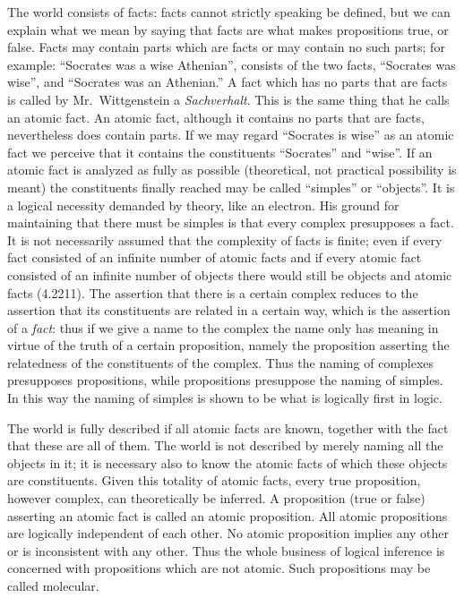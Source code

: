 The world consists of facts: facts cannot strictly speaking be defined, but we can explain what we mean by saying that facts are what makes propositions true, or false. Facts may contain parts which are facts or may contain no such parts; for example: “Socrates was a wise Athenian”, consists of the two facts, “Socrates was wise”, and “Socrates was an Athenian.” A fact which has no parts that are facts is called by Mr.\ Wittgenstein a \emph{Sachverhalt}. This is the same thing that he calls an atomic fact. An atomic fact, although it contains no parts that are facts, nevertheless does contain parts. If we may regard “Socrates is wise” as an atomic fact we perceive that it contains the constituents “Socrates” and “wise”. If an atomic fact is analyzed as fully as possible (theoretical, not practical possibility is meant) the constituents finally reached may be called “simples” or “objects”. It is a logical necessity demanded by theory, like an electron. His ground for maintaining that there must be simples is that every complex presupposes a fact. It is not necessarily assumed that the complexity of facts is finite; even if every fact consisted of an infinite number of atomic facts and if every atomic fact consisted of an infinite number of objects there would still be objects and atomic facts (4.2211). The assertion that there is a certain complex reduces to the assertion that its constituents are related in a certain way, which is the assertion of a \emph{fact}: thus if we give a name to the complex the name only has meaning in virtue of the truth of a certain proposition, namely the proposition asserting the relatedness of the constituents of the complex. Thus the naming of complexes presupposes propositions, while propositions presuppose the naming of simples. In this way the naming of simples is shown to be what is logically first in logic.

The world is fully described if all atomic facts are known, together with the fact that these are all of them. The world is not described by merely naming all the objects in it; it is necessary also to know the atomic facts of which these objects are constituents. Given this totality of atomic facts, every true proposition, however complex, can theoretically be inferred. A proposition (true or false) asserting an atomic fact is called an atomic proposition. All atomic propositions are logically independent of each other. No atomic proposition implies any other or is inconsistent with any other. Thus the whole business of logical inference is concerned with propositions which are not atomic. Such propositions may be called molecular.

